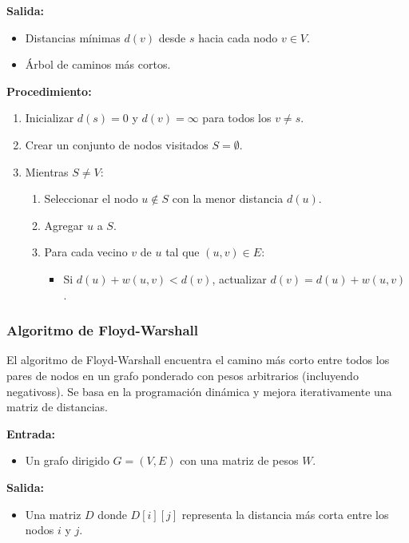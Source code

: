 \documentclass[openany]{book}
\begin{document}
			\textbf{Salida:}
			\begin{itemize}
				\item Distancias mínimas $d(v)$ desde $s$ hacia cada nodo $v \in V$.
				\item Árbol de caminos más cortos.
			\end{itemize}

			\textbf{Procedimiento:}
			\begin{enumerate}
				\item Inicializar $d(s) = 0$ y $d(v) = \infty$ para todos los $v \neq s$.
				\item Crear un conjunto de nodos visitados $S = \emptyset$.
				\item Mientras $S \neq V$:
				\begin{enumerate}
					\item Seleccionar el nodo $u \notin S$ con la menor distancia $d(u)$.
					\item Agregar $u$ a $S$.
					\item Para cada vecino $v$ de $u$ tal que $(u,v) \in E$:
					\begin{itemize}
						\item Si $d(u) + w(u,v) < d(v)$, actualizar $d(v) = d(u) + w(u,v)$.
					\end{itemize}
				\end{enumerate}
			\end{enumerate}

			\subsubsection{Algoritmo de Floyd-Warshall}

			El algoritmo de Floyd-Warshall encuentra el camino más corto entre todos los pares de nodos en un grafo ponderado con pesos arbitrarios (incluyendo negativoss). Se basa en la programación dinámica y mejora iterativamente una matriz de distancias.

			\textbf{Entrada:}
			\begin{itemize}
				\item Un grafo dirigido $G = (V, E)$ con una matriz de pesos $W$.
			\end{itemize}

			\textbf{Salida:}
			\begin{itemize}
				\item Una matriz $D$ donde $D[i][j]$ representa la distancia más corta entre los nodos $i$ y $j$.
			\end{itemize}
\end{document}
